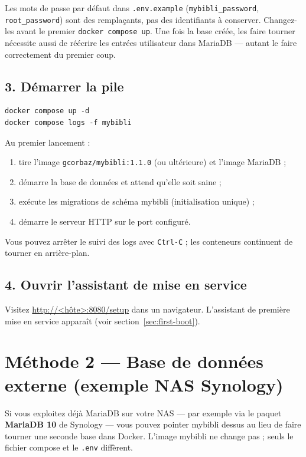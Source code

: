 \begin{warning}
Les mots de passe par défaut dans \texttt{.env.example}
(\texttt{mybibli\_password}, \texttt{root\_password}) sont des
remplaçants, pas des identifiants à conserver. Changez-les avant le
premier \texttt{docker compose up}. Une fois la base créée, les faire
tourner nécessite aussi de réécrire les entrées utilisateur dans
MariaDB — autant le faire correctement du premier coup.
\end{warning}

\subsection*{3. Démarrer la pile}

\begin{lstlisting}
docker compose up -d
docker compose logs -f mybibli
\end{lstlisting}

Au premier lancement :

\begin{enumerate}
  \item tire l'image \texttt{gcorbaz/mybibli:1.1.0} (ou ultérieure)
        et l'image MariaDB ;
  \item démarre la base de données et attend qu'elle soit saine ;
  \item exécute les migrations de schéma mybibli
        (initialisation unique) ;
  \item démarre le serveur HTTP sur le port configuré.
\end{enumerate}

Vous pouvez arrêter le suivi des logs avec \texttt{Ctrl-C} ; les
conteneurs continuent de tourner en arrière-plan.

\subsection*{4. Ouvrir l'assistant de mise en service}

Visitez \url{http://<hôte>:8080/setup} dans un navigateur. L'assistant
de première mise en service
apparaît (voir section~\ref{sec:first-boot}).

\section{Méthode 2 — Base de données externe (exemple NAS Synology)}\label{sec:install-external-db}

Si vous exploitez déjà MariaDB sur votre NAS — par exemple via le
paquet \textbf{MariaDB 10} de Synology — vous pouvez pointer mybibli
dessus au lieu de faire tourner une seconde base dans Docker. L'image
mybibli ne change pas ; seuls le fichier compose et le \texttt{.env}
diffèrent.

